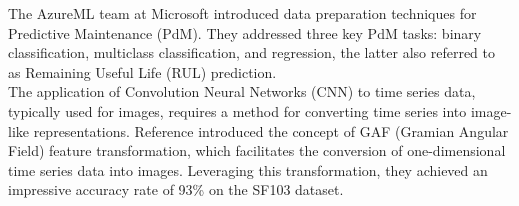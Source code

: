 \documentclass{article}
\begin{document}
The AzureML team at Microsoft \cite{AzureML2015} introduced data preparation techniques for Predictive Maintenance (PdM). They addressed three key PdM tasks: binary classification, multiclass classification, and regression, the latter also referred to as Remaining Useful Life (RUL) prediction. \\

The application of Convolution Neural Networks (CNN) to time series data, typically used for
images, requires a method for converting time series into image-like representations. 
Reference \cite{Silva2019} introduced the concept of GAF (Gramian Angular Field) feature 
transformation, which facilitates the conversion of one-dimensional time series data into images. Leveraging this transformation, they achieved an impressive accuracy rate of 93\% on the SF103 dataset.




\end{document}
